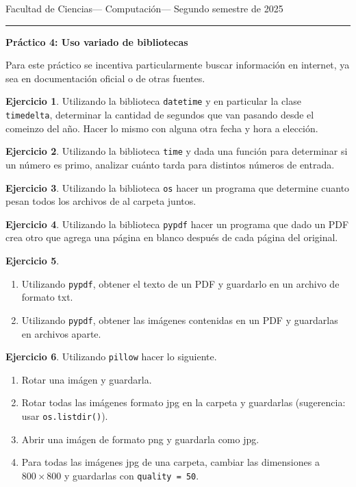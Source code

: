 \documentclass[a4paper,12pt]{book}
\theoremstyle{definition}
\newtheorem{ejercicio}{Ejercicio}
\begin{document}
	
	\noindent
	\centerline{\sc
		Facultad de Ciencias\hfill---\hfill
		Computación\hfill---\hfill
		Segundo semestre de 2025}\smallbreak\hrule
	
	\bigbreak
	\centerline{\Large\textbf{Práctico 4: Uso variado de bibliotecas}}
	\bigbreak
	
	Para este práctico se incentiva particularmente buscar información en internet, ya sea en documentación oficial o de otras fuentes.
	
	\begin{ejercicio}
		Utilizando la biblioteca {\tt datetime} y en particular la clase {\tt timedelta}, determinar la cantidad de segundos que van pasando desde el comeinzo del año. Hacer lo mismo con alguna otra fecha y hora a elección.
	\end{ejercicio}
	
	\begin{ejercicio}
		Utilizando la biblioteca {\tt time} y dada una función para determinar si un número es primo, analizar cuánto tarda para distintos números de entrada.
	\end{ejercicio}
	
	\begin{ejercicio}
		Utilizando la biblioteca {\tt os} hacer un programa que determine cuanto pesan todos los archivos de al carpeta juntos.
	\end{ejercicio}
	
	\begin{ejercicio}
		Utilizando la biblioteca {\tt pypdf} hacer un programa que dado un PDF crea otro que agrega una página en blanco después de cada página del original.
	\end{ejercicio}
	
	\begin{ejercicio}
		\begin{enumerate}
			\item Utilizando {\tt pypdf}, obtener el texto de un PDF y guardarlo en un archivo de formato txt.
			
			\item Utilizando {\tt pypdf}, obtener las imágenes contenidas en un PDF y guardarlas en archivos aparte.
		\end{enumerate}
	\end{ejercicio}
	
	\begin{ejercicio}
		Utilizando {\tt pillow} hacer lo siguiente.
		\begin{enumerate}
			\item Rotar una imágen y guardarla.
			\item Rotar todas las imágenes formato jpg en la carpeta y guardarlas (sugerencia: usar {\tt os.listdir()}).
			\item Abrir una imágen de formato png y guardarla como jpg.
			\item Para todas las imágenes jpg de una carpeta, cambiar las dimensiones a $800\times 800$ y guardarlas con {\tt quality = 50}.
		\end{enumerate}
	\end{ejercicio}
	
\end{document}

